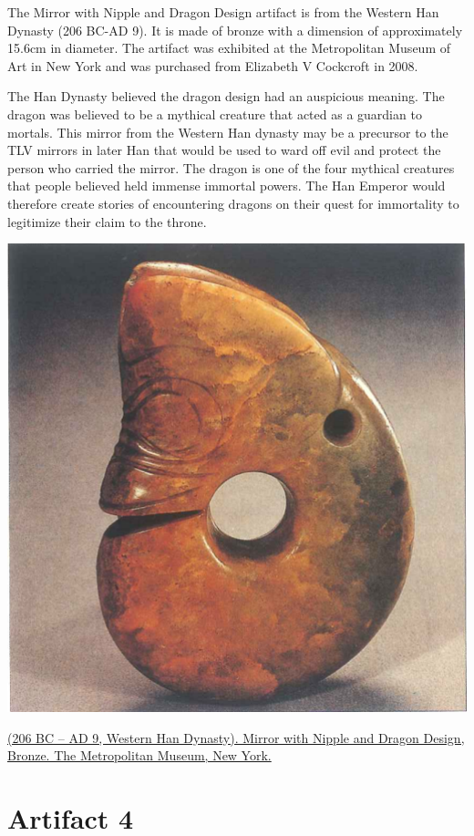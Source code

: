 \documentclass[
]{book}
\begin{document}
The Mirror with Nipple and Dragon Design artifact is from the Western Han Dynasty (206 BC-AD 9). It is made of bronze with a dimension of approximately 15.6cm in diameter. The artifact was exhibited at the Metropolitan Museum of Art in New York and was purchased from Elizabeth V Cockcroft in 2008.

The Han Dynasty believed the dragon design had an auspicious meaning. The dragon was believed to be a mythical creature that acted as a guardian to mortals. This mirror from the Western Han dynasty may be a precursor to the TLV mirrors in later Han that would be used to ward off evil and protect the person who carried the mirror. The dragon is one of the four mythical creatures that people believed held immense immortal powers. The Han Emperor would therefore create stories of encountering dragons on their quest for immortality to legitimize their claim to the throne.

\includegraphics[width=1\textwidth,height=\textheight]{images/1. Jade_Pig_Dragon.png}

\href{https://www.metmuseum.org/art/collection/search/74429}{(206 BC -- AD 9, Western Han Dynasty). Mirror with Nipple and Dragon Design, Bronze. The Metropolitan Museum, New York.}

\hypertarget{artifact4}{%
\chapter*{Artifact 4}\label{artifact4}}
\end{document}
